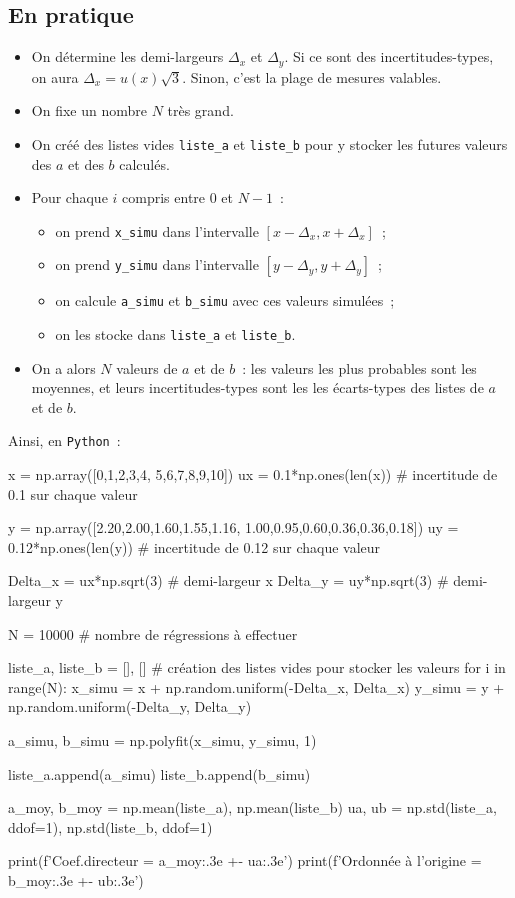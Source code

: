 \documentclass[a4paper, 12pt, garamond]{book}
\begin{document}
\subsection{En pratique}
\begin{itemize}[label=$\diamond$, leftmargin=10pt]
  \item On détermine les demi-largeurs $\Delta_x$ et $\Delta_y$. Si ce sont des
    incertitudes-types, on aura $\Delta_x = u(x)\sqrt{3}$. Sinon, c'est la plage
    de mesures valables.
  \item On fixe un nombre $N$ très grand.
  \item On créé des listes vides \texttt{liste\_a} et \texttt{liste\_b} pour y
    stocker les futures valeurs des $a$ et des $b$ calculés.
  \item Pour chaque $i$ compris entre $0$ et $N-1$~:
    \begin{itemize}[label=$\triangleright$]
      \item on prend \texttt{x\_simu} dans l'intervalle $[x-\Delta_x,
        x+\Delta_x]$~;
      \item on prend \texttt{y\_simu} dans l'intervalle $[y-\Delta_y,
        y+\Delta_y]$~;
      \item on calcule \texttt{a\_simu} et \texttt{b\_simu} avec ces valeurs
        simulées~;
      \item on les stocke dans \texttt{liste\_a} et \texttt{liste\_b}.
    \end{itemize}
  \item On a alors $N$ valeurs de $a$ et de $b$~: les valeurs les plus probables
    sont les moyennes, et leurs incertitudes-types sont les les écarts-types des
    listes de $a$ et de $b$.
\end{itemize}

Ainsi, en \texttt{Python}~:
\begin{python}
x = np.array([0,1,2,3,4, 5,6,7,8,9,10])
ux = 0.1*np.ones(len(x))   # incertitude de 0.1 sur chaque valeur

y = np.array([2.20,2.00,1.60,1.55,1.16, 1.00,0.95,0.60,0.36,0.36,0.18])
uy = 0.12*np.ones(len(y))  # incertitude de 0.12 sur chaque valeur

Delta_x = ux*np.sqrt(3)    # demi-largeur x
Delta_y = uy*np.sqrt(3)    # demi-largeur y

N = 10000                  # nombre de régressions à effectuer

liste_a, liste_b = [], []  # création des listes vides pour stocker les valeurs
for i in range(N):
    x_simu = x + np.random.uniform(-Delta_x, Delta_x)
    y_simu = y + np.random.uniform(-Delta_y, Delta_y)

    a_simu, b_simu = np.polyfit(x_simu, y_simu, 1)

    liste_a.append(a_simu)
    liste_b.append(b_simu)

a_moy, b_moy = np.mean(liste_a), np.mean(liste_b)
ua, ub = np.std(liste_a, ddof=1), np.std(liste_b, ddof=1)

print(f'Coef.directeur = {a_moy:.3e} +- {ua:.3e}')
print(f'Ordonnée à l'origine = {b_moy:.3e} +- {ub:.3e}')
\end{python}
\end{document}

